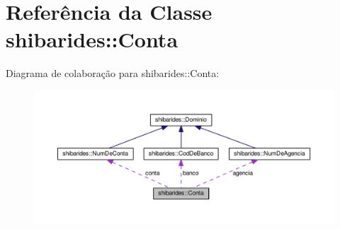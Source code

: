 \hypertarget{classshibarides_1_1Conta}{}\section{Referência da Classe shibarides\+:\+:Conta}
\label{classshibarides_1_1Conta}


Diagrama de colaboração para shibarides\+:\+:Conta\+:\nopagebreak
\begin{figure}[H]
\begin{center}
\leavevmode
\includegraphics[width=350pt]{classshibarides_1_1Conta__coll__graph}
\end{center}
\end{figure}
